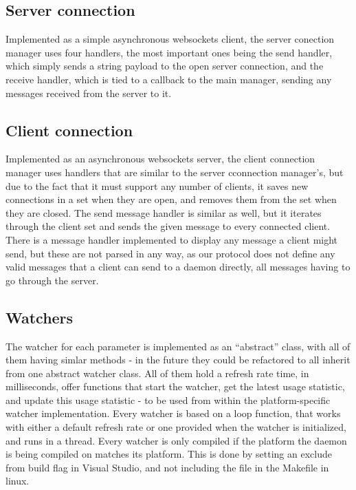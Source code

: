 \documentclass{l3proj}
\begin{document}
\subsection{Server connection}

Implemented as a simple asynchronous websockets client, the server conection manager uses four handlers, the most important ones being the send handler, which simply sends a string payload to the open server connection, and the receive handler, which is tied to a callback to the main manager, sending any messages received from the server to it.

\subsection{Client connection}

Implemented as an asynchronous websockets server, the client connection manager uses handlers that are similar to the server cconnection manager's, but due to the fact that it must support any number of clients, it saves new connections in a set when they are open, and removes them from the set when they are closed. The send message handler is similar as well, but it iterates through the client set and sends the given message to every connected client. There is a message handler implemented to display any message a client might send, but these are not parsed in any way, as our protocol does not define any valid messages that a client can send to a daemon directly, all messages having to go through the server.

\subsection{Watchers}

The watcher for each parameter is implemented as an ``abstract'' class, with all of them having simlar methods - in the future they could be refactored to all inherit from one abstract watcher class. All of them hold a refresh rate time, in milliseconds, offer functions that start the watcher, get the latest usage statistic, and update this usage statistic - to be used from within the platform-specific watcher implementation. Every watcher is based on a loop function, that works with either a default refresh rate or one provided when the watcher is initialized, and runs in a thread.
Every watcher is only compiled if the platform the daemon is being compiled on matches its platform. This is done by setting an exclude from build flag in Visual Studio, and not including the file in the Makefile in linux.
\end{document}
